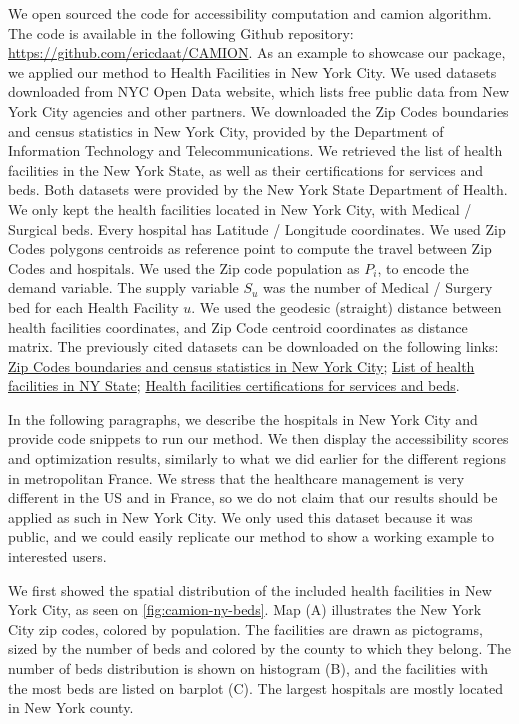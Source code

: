 We open sourced the code for accessibility computation and \ac{camion}
algorithm. The code is available in the following Github repository:
\url{https://github.com/ericdaat/CAMION}. As an example to showcase our package,
we applied our method to Health Facilities in New York City. We used datasets
downloaded from NYC Open Data website, which lists free public data from New
York City agencies and other partners. We downloaded the Zip Codes boundaries
and census statistics in New York City, provided by the Department of
Information Technology and Telecommunications. We retrieved the list of health
facilities in the New York State, as well as their certifications for services
and beds. Both datasets were provided by the New York State Department of
Health. We only kept the health facilities located in New York City, with
Medical / Surgical beds. Every hospital has Latitude / Longitude coordinates. We
used Zip Codes polygons centroids as reference point to compute the travel
between Zip Codes and hospitals. We used the Zip code population as $P_i$, to
encode the demand variable. The supply variable $S_u$ was the number of Medical
/ Surgery bed for each Health Facility $u$. We used the geodesic (straight)
distance between health facilities coordinates, and Zip Code centroid
coordinates as distance matrix. The previously cited datasets can be downloaded
on the following links:
\href{https://data.beta.nyc/dataset/nyc-zip-code-tabulation-areas/resource/894e9162-871c-4552-a09c-c6915d8783fb}{Zip
    Codes boundaries and census statistics in New York City};
\href{https://health.data.ny.gov/Health/Health-Facility-General-Information/vn5v-hh5r}{List
    of health facilities in NY State};
\href{https://health.data.ny.gov/Health/Health-Facility-Certification-Information/2g9y-7kqm}{Health
    facilities certifications for services and beds}.

In the following paragraphs, we describe the hospitals in New York City and
provide code snippets to run our method. We then display the accessibility scores
and optimization results, similarly to what we did earlier for the different
regions in metropolitan France. We stress that the healthcare management is very
different in the US and in France, so we do not claim that our results should
be applied as such in New York City. We only used this dataset because it was
public, and we could easily replicate our method to show a working example to
interested users.

We first showed the spatial distribution of the included health facilities
in New York City, as seen on \cref{fig:camion-ny-beds}. Map (A) illustrates
the New York City zip codes, colored by population. The facilities are drawn
as pictograms, sized by the number of beds and colored by the county to which
they belong. The number of beds distribution is shown on histogram (B),
and the facilities with the most beds are listed on barplot (C). The largest
hospitals are mostly located in New York county.

